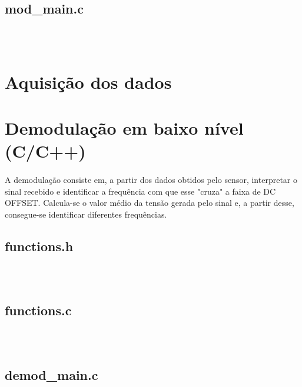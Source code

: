 \documentclass[11pt,a4paper]{report}
\begin{document}
	\subsection{mod_main.c}
		\begin{verbatim}
		
		
		\end{verbatim}
		
	\section{Aquisição dos dados}


	\section{Demodulação em baixo nível (C/C++)}
	\paragraph{}
		A demodulação consiste em, a partir dos dados obtidos pelo sensor, interpretar o sinal recebido e identificar a frequência com que esse "cruza" a faixa de DC OFFSET. Calcula-se o valor médio da tensão gerada pelo sinal e, a partir desse, consegue-se identificar diferentes frequências.
	
	\subsection{functions.h}
		\begin{verbatim}
		
		
		\end{verbatim}
		
	
	\subsection{functions.c}
		\begin{verbatim}
		
		
		\end{verbatim}
		
		
	\subsection{demod_main.c}
		\begin{verbatim}
		
		
		\end{verbatim}
		
	

	
		
\end{document}
